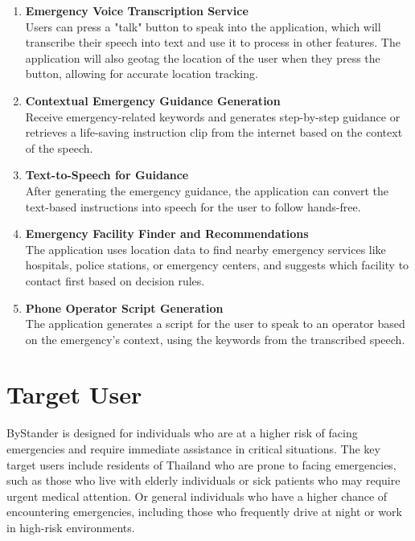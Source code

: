 \begin{enumerate}[leftmargin=80pt]
    \item \textbf{Emergency Voice Transcription Service} \\
    Users can press a "talk" button to speak into the application, which will transcribe their speech into text and use it to process in other features. The application will also geotag the location of the user when they press the button, allowing for accurate location tracking.
    \item \textbf{Contextual Emergency Guidance Generation} \\
    Receive emergency-related keywords and generates step-by-step guidance or retrieves a life-saving instruction clip from the internet based on the context of the speech.
    \item \textbf{Text-to-Speech for Guidance} \\
    After generating the emergency guidance, the application can convert the text-based instructions into speech for the user to follow hands-free.
    \item \textbf{Emergency Facility Finder and Recommendations} \\
    The application uses location data to find nearby emergency services like hospitals, police stations, or emergency centers, and suggests which facility to contact first based on decision rules.
    \item \textbf{Phone Operator Script Generation} \\
    The application generates a script for the user to speak to an operator based on the emergency's context, using the keywords from the transcribed speech.
\end{enumerate}

\section{Target User}
\label{section:target-user}

ByStander is designed for individuals who are at a higher risk of facing emergencies and require immediate assistance in critical situations. The key target users include residents of Thailand who are prone to facing emergencies, such as those who live with elderly individuals or sick patients who may require urgent medical attention. Or general individuals who have a higher chance of encountering emergencies, including those who frequently drive at night or work in high-risk environments.

